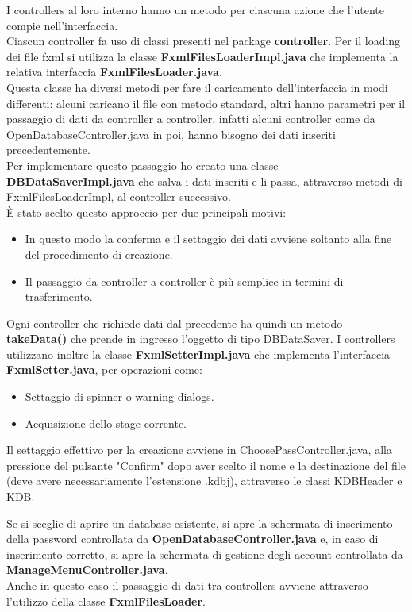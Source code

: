 \documentclass[a4paper,12pt]{report}
\begin{document}
I controllers al loro interno hanno un metodo per ciascuna azione che l'utente compie nell'interfaccia.\\ Ciascun controller fa uso di classi presenti nel package \textbf{controller}. Per il loading dei file fxml si utilizza la classe \textbf{FxmlFilesLoaderImpl.java} che implementa la relativa interfaccia \textbf{FxmlFilesLoader.java}.\\
Questa classe ha diversi metodi per fare il caricamento dell'interfaccia in modi differenti: alcuni caricano il file con metodo standard, altri hanno parametri per il passaggio di dati da controller a controller, infatti alcuni controller come da OpenDatabaseController.java in poi, hanno bisogno dei dati inseriti precedentemente.\\
Per implementare questo passaggio ho creato una classe \textbf{DBDataSaverImpl.java} che salva i dati inseriti e li passa, attraverso metodi di FxmlFilesLoaderImpl, al controller successivo. \\
È stato scelto questo approccio per due principali motivi:
\begin{itemize}
    \item In questo modo la conferma e il settaggio dei dati avviene soltanto alla fine del procedimento di creazione.
    \item Il passaggio da controller a controller è più semplice in termini di trasferimento.
\end{itemize}

Ogni controller che richiede dati dal precedente ha quindi un metodo \textbf{takeData()} che prende in ingresso l'oggetto di tipo DBDataSaver.
I controllers utilizzano inoltre la classe \textbf{FxmlSetterImpl.java} che implementa l'interfaccia \textbf{FxmlSetter.java}, per operazioni come:
\begin{itemize}
    \item Settaggio di spinner o warning dialogs.
    \item Acquisizione dello stage corrente.
\end{itemize}

Il settaggio effettivo per la creazione avviene in ChoosePassController.java, alla pressione del pulsante "Confirm" dopo aver scelto il nome e la destinazione del file (deve avere necessariamente l'estensione .kdbj), attraverso le classi KDBHeader e KDB.

Se si sceglie di aprire un database esistente, si apre la schermata di inserimento della password controllata da \textbf{OpenDatabaseController.java} e, in caso di inserimento corretto, si apre la schermata di gestione degli account controllata da \textbf{ManageMenuController.java}.\\
Anche in questo caso il passaggio di dati tra controllers avviene attraverso l'utilizzo della classe \textbf{FxmlFilesLoader}.
\end{document}
